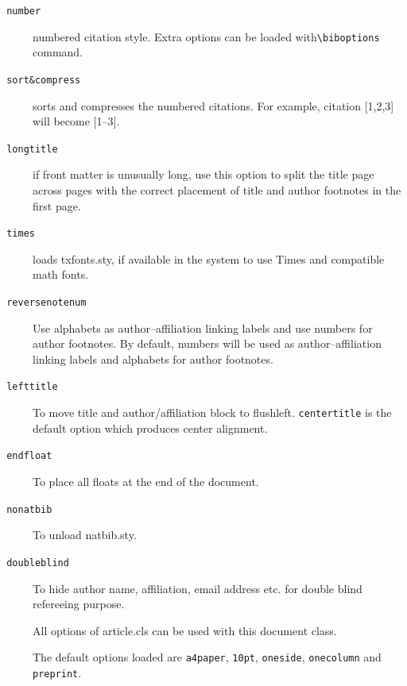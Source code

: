 \documentclass[a4paper,12pt]{article}
\def\file#1{\textsf{#1}\xspace}
\begin{document}
\begin{description}
\item [{\tt\color{verbcolor} number}] numbered citation style. Extra options
  can be loaded with\linebreak \verb+\biboptions+ command.

\item [{\tt\color{verbcolor} sort\&compress}] sorts and compresses the
numbered citations. For example, citation [1,2,3] will become [1--3].

\item [{\tt\color{verbcolor} longtitle}] if front matter is unusually long, use
  this option to split the title page across pages with the correct
placement of title and author footnotes in the first page.

\item [{\tt\color{verbcolor} times}] loads \file{txfonts.sty}, if
available in the system to use Times and compatible math fonts.

\item [{\tt\color{verbcolor} reversenotenum}] Use alphabets as
author--affiliation linking labels and use numbers for author
footnotes. By default, numbers will be used as author--affiliation
linking labels and alphabets for author footnotes.

\item [{\tt\color{verbcolor} lefttitle}] To move title and
author/affiliation block to flushleft. \verb+centertitle+ is the
default option which produces center alignment.

\item [{\tt\color{verbcolor} endfloat}] To place all floats at the end
of the document.

\item [{\tt\color{verbcolor} nonatbib}] To unload natbib.sty.

\item [{\tt\color{verbcolor} doubleblind}] To hide author name,
affiliation, email address etc. for double blind refereeing purpose.

\item[] All options of \file{article.cls} can be used with this
  document class.

\item[] The default options loaded are \verb+a4paper+, \verb+10pt+,
  \verb+oneside+, \verb+onecolumn+ and \verb+preprint+.

\end{description}
\end{document}
